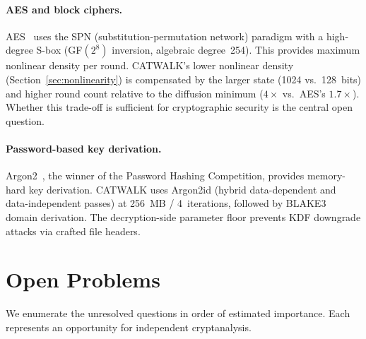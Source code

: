 \documentclass[runningheads]{llncs}
\begin{document}
\paragraph{AES and block ciphers.}
AES~\cite{daemen2001aes,fips197} uses the SPN (substitution-permutation network)
paradigm with a high-degree S-box (GF$(2^8)$ inversion, algebraic degree~254).
This provides maximum nonlinear density per round.  CATWALK's lower nonlinear
density (Section~\ref{sec:nonlinearity}) is compensated by the larger state
(1024 vs.\ 128~bits) and higher round count relative to the diffusion minimum
($4\times$ vs.\ AES's $1.7\times$).  Whether this trade-off is sufficient for
cryptographic security is the central open question.

\paragraph{Password-based key derivation.}
Argon2~\cite{rfc9106}, the winner of the Password Hashing Competition, provides
memory-hard key derivation.  CATWALK uses Argon2id (hybrid data-dependent and
data-independent passes) at 256~MB / 4~iterations, followed by BLAKE3~\cite{blake3}
domain derivation.  The decryption-side parameter floor prevents KDF downgrade
attacks via crafted file headers.

\section{Open Problems}
\label{sec:openproblems}

We enumerate the unresolved questions in order of estimated importance.
Each represents an opportunity for independent cryptanalysis.
\end{document}

